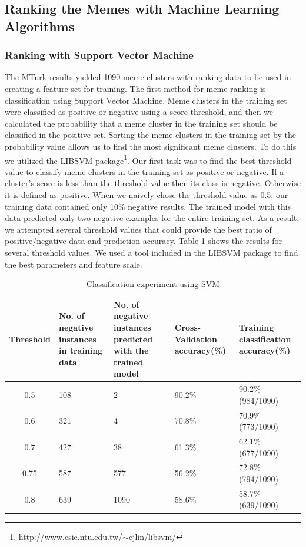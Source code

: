 \documentclass{sig-alternate}
\begin{document}
\subsection{Ranking the Memes with Machine Learning Algorithms}
\subsubsection{Ranking with Support Vector Machine}

The MTurk results yielded 1090 meme clusters with ranking data to be used in creating a feature set for training. The first method for meme ranking is classification using Support Vector Machine. Meme clusters in the training set were classified as positive or negative using a score threshold, and then we calculated the probability that a meme cluster in the training set should be classified in the positive set. Sorting the meme clusters in the training set by the probability value allows us to find the most significant meme clusters. To do this we utilized the LIBSVM package\footnote{http://www.csie.ntu.edu.tw/$\sim$cjlin/libsvm/}. Our first task was to find the best threshold value to classify meme clusters in the training set as positive or negative. If a cluster's score is less than the threshold value then its class is negative. Otherwise it is defined as positive. When we naively chose the threshold value as 0.5, our training data contained only 10\% negative results. The trained model with this data predicted only two negative examples for the entire training set. As a result, we attempted several threshold values that could provide the best ratio of positive/negative data and prediction accuracy. Table \ref{table:svm} shows the results for several threshold values. We used a tool included in the LIBSVM package to find the best parameters and feature scale.

\begin{table}[t!hb]
\begin{center}
\begin{tabular}{c|p{3.5cm}|p{3.5cm}|p{3.5cm}|p{3.5cm}}

Threshold&No. of negative instances in training data&No. of negative instances predicted with the trained model&Cross-Validation accuracy(\%)&Training classification accuracy(\%)\\
\hline
0.5&108&2&90.2\%&90.2\% (984/1090)\\
0.6&321&4&70.8\%&70.9\% (773/1090)\\
0.7&427&38&61.3\%&62.1\% (677/1090)\\
0.75&587&577&56.2\%&72.8\% (794/1090)\\
0.8&639&1090&58.6\%&58.7\% (639/1090)\\
\end{tabular}
\caption{Classification experiment using SVM}
\label{table:svm}
\end{center}
\end{table}
\end{document}
